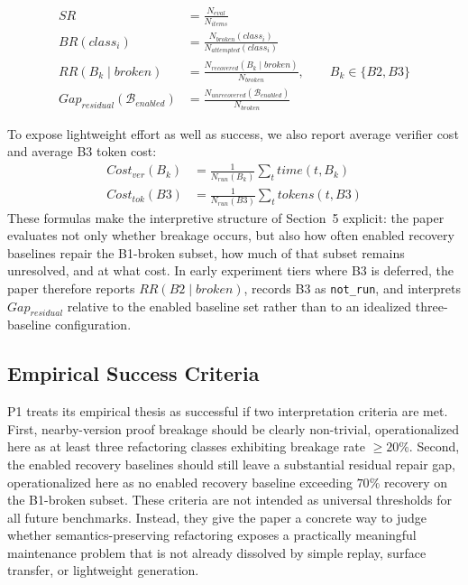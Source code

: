 \begin{align}
SR &= \frac{N_{\mathit{eval}}}{N_{\mathit{items}}} \\
BR(class_i) &= \frac{N_{\mathit{broken}}(class_i)}{N_{\mathit{attempted}}(class_i)} \\
RR(B_k \mid \mathit{broken}) &= \frac{N_{\mathit{recovered}}(B_k \mid \mathit{broken})}{N_{\mathit{broken}}}, \qquad B_k \in \{B2, B3\} \\
Gap_{\mathit{residual}}(\mathcal{B}_{\mathit{enabled}}) &= \frac{N_{\mathit{unrecovered}}(\mathcal{B}_{\mathit{enabled}})}{N_{\mathit{broken}}}
\end{align}

To expose lightweight effort as well as success, we also report average verifier cost and average B3 token cost:
\begin{align}
Cost_{\mathit{ver}}(B_k) &= \frac{1}{N_{\mathit{run}}(B_k)} \sum_t time(t, B_k) \\
Cost_{\mathit{tok}}(B3) &= \frac{1}{N_{\mathit{run}}(B3)} \sum_t tokens(t, B3)
\end{align}
These formulas make the interpretive structure of Section~5 explicit: the paper evaluates not only whether breakage occurs, but also how often enabled recovery baselines repair the B1-broken subset, how much of that subset remains unresolved, and at what cost. In early experiment tiers where B3 is deferred, the paper therefore reports $RR(B2 \mid \mathit{broken})$, records B3 as \texttt{not\_run}, and interprets $Gap_{\mathit{residual}}$ relative to the enabled baseline set rather than to an idealized three-baseline configuration.

\subsection{Empirical Success Criteria}

P1 treats its empirical thesis as successful if two interpretation criteria are met. First, nearby-version proof breakage should be clearly non-trivial, operationalized here as at least three refactoring classes exhibiting breakage rate $\geq 20\%$. Second, the enabled recovery baselines should still leave a substantial residual repair gap, operationalized here as no enabled recovery baseline exceeding $70\%$ recovery on the B1-broken subset. These criteria are not intended as universal thresholds for all future benchmarks. Instead, they give the paper a concrete way to judge whether semantics-preserving refactoring exposes a practically meaningful maintenance problem that is not already dissolved by simple replay, surface transfer, or lightweight generation.
